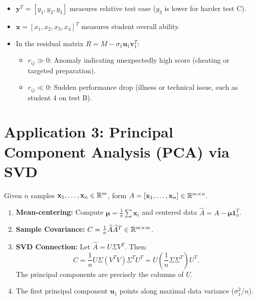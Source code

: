 \begin{itemize}
    \item $\mathbf{y}^T = [y_1, y_2, y_3]$ measures relative test ease ($y_3$ is lower for harder test C).
    \item $\mathbf{x} = [x_1, x_2, x_3, x_4]^T$ measures student overall ability.
    \item In the residual matrix $R = M - \sigma_1 \mathbf{u}_1 \mathbf{v}_1^T$:
    \begin{itemize}
        \item $r_{ij} \gg 0$: Anomaly indicating unexpectedly high score (cheating or targeted preparation).
        \item $r_{ij} \ll 0$: Sudden performance drop (illness or technical issue, such as student 4 on test B).
    \end{itemize}
\end{itemize}

\FloatBarrier
\section{Application 3: Principal Component Analysis (PCA) via SVD}
\label{sec:application-pca-svd-en}

Given $n$ samples $\mathbf{x}_1, \dots, \mathbf{x}_n \in \mathbb{R}^m$, form $A = [\mathbf{x}_1, \dots, \mathbf{x}_n] \in \mathbb{R}^{m \times n}$.
\begin{enumerate}
    \item \textbf{Mean-centering:} Compute $\boldsymbol{\mu} = \frac{1}{n} \sum \mathbf{x}_i$ and centered data $\widehat{A} = A - \boldsymbol{\mu} \mathbf{1}_n^T$.
    \item \textbf{Sample Covariance:} $C = \frac{1}{n} \widehat{A}\widehat{A}^T \in \mathbb{R}^{m \times m}$.
    \item \textbf{SVD Connection:} Let $\widehat{A} = U \Sigma V^T$. Then:
    \begin{equation}
        C = \frac{1}{n} U \Sigma (V^T V) \Sigma^T U^T = U \left( \frac{1}{n} \Sigma \Sigma^T \right) U^T.
    \end{equation}
    The principal components are precisely the columns of $U$.
    \item The first principal component $\mathbf{u}_1$ points along maximal data variance ($\sigma_1^2 / n$).
\end{enumerate}

